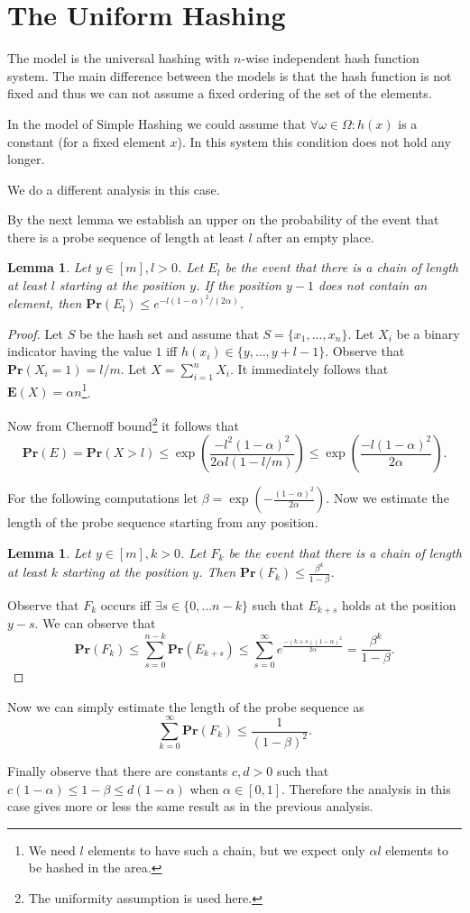 \documentclass[12pt,notitlepage]{report}
\theoremstyle{definition}
\theoremstyle{plain}
\newtheorem{lemma}[definition]{Lemma}
\newcommand{\Prob}[1]{\mathbf{Pr}\left(#1\right)}
\newcommand{\Expect}[1]{\mathbf{E}\left(#1\right)}
\begin{document}
\section{The Uniform Hashing}

The model is the universal hashing with $n$-wise independent hash function system. The main difference between the models is that the hash function is not fixed and thus we can not assume a fixed ordering of the set of the elements.

In the model of Simple Hashing we could assume that $\forall \omega \in \Omega \colon h(x)$ is a constant (for a fixed element $x$). In this system this condition does not hold any longer.

We do a different analysis in this case.

By the next lemma we establish an upper on the probability of the event that there is a probe sequence of length at least $l$ after an empty place.
\begin{lemma}
Let $y \in [m], l > 0$. Let $E_l$ be the event that there is a chain of length at least $l$ starting at the position $y$.
If the position $y - 1$ does not contain an element, then $\Prob{E_l} \leq e^{-l(1-\alpha)^2/(2 \alpha)}$.
\end{lemma}
\begin{proof}
Let $S$ be the hash set and assume that $S = \{x_1, \dots, x_n\}$.
Let $X_i$ be a binary indicator having the value $1$ iff $h(x_i) \in \{y, \dots, y + l - 1\}$.
Observe that $\Prob{X_i = 1} = l / m$.
Let $X = \sum_{i = 1}^n X_i$.
It immediately follows that $\Expect{X} = \alpha n$\footnote{We need $l$ elements to have such a chain, but we expect only $\alpha l$ elements to be hashed in the area.}.

Now from Chernoff bound\footnote{The uniformity assumption is used here.} it follows that 
\[
	\Prob{E} = \Prob{X > l} \leq \exp\left(\frac{-l^2(1 - \alpha)^2}{2\alpha l (1 - l/m)}\right) \leq \exp\left(\frac{-l(1 - \alpha)^2}{2\alpha}\right).
\]

For the following computations let $\beta = \exp\left(-\frac{(1 - \alpha)^2}{2\alpha}\right)$. Now we estimate the length of the probe sequence starting from any position.

\begin{lemma}
Let $y \in [m], k > 0$. Let $F_k$ be the event that there is a chain of length at least $k$ starting at the position $y$.
Then $\Prob{F_k} \leq \frac{\beta^k}{1 - \beta}$.
\end{lemma}
Observe that $F_k$ occurs iff $\exists s \in \{0, \dots n - k\}$ such that $E_{k + s}$ holds at the position $y - s$.
We can observe that
\[
\Prob{F_k} \leq \sum_{s = 0}^{n - k} \Prob{E_{k + s}} \leq \sum_{s = 0}^{\infty} e^{\frac{-(k + s)(1 - \alpha)^2}{2\alpha}} = \frac{\beta^k}{1 - \beta}.
\]
\end{proof}

Now we can simply estimate the length of the probe sequence as 
\[
\sum_{k = 0}^\infty \Prob{F_k} \leq \frac{1}{(1 - \beta)^2}.
\]

Finally observe that there are constants $c, d > 0$ such that $c(1 - \alpha) \leq 1 - \beta \leq d(1 - \alpha)$ when $\alpha \in [0, 1]$. Therefore the analysis in this case gives more or less the same result as in the previous analysis.
\end{document}
